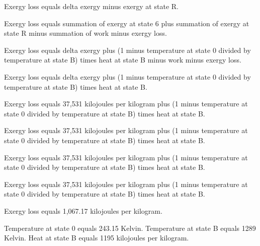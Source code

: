 Exergy loss equals delta exergy minus exergy at state R.  

Exergy loss equals summation of exergy at state 6 plus summation of exergy at state R minus summation of work minus exergy loss.  

Exergy loss equals delta exergy plus (1 minus temperature at state 0 divided by temperature at state B) times heat at state B minus work minus exergy loss.  

Exergy loss equals delta exergy plus (1 minus temperature at state 0 divided by temperature at state B) times heat at state B.  

Exergy loss equals 37,531 kilojoules per kilogram plus (1 minus temperature at state 0 divided by temperature at state B) times heat at state B.  

Exergy loss equals 37,531 kilojoules per kilogram plus (1 minus temperature at state 0 divided by temperature at state B) times heat at state B.  

Exergy loss equals 37,531 kilojoules per kilogram plus (1 minus temperature at state 0 divided by temperature at state B) times heat at state B.  

Exergy loss equals 37,531 kilojoules per kilogram plus (1 minus temperature at state 0 divided by temperature at state B) times heat at state B.  

Exergy loss equals 1,067.17 kilojoules per kilogram.  

Temperature at state 0 equals 243.15 Kelvin.  
Temperature at state B equals 1289 Kelvin.  
Heat at state B equals 1195 kilojoules per kilogram.